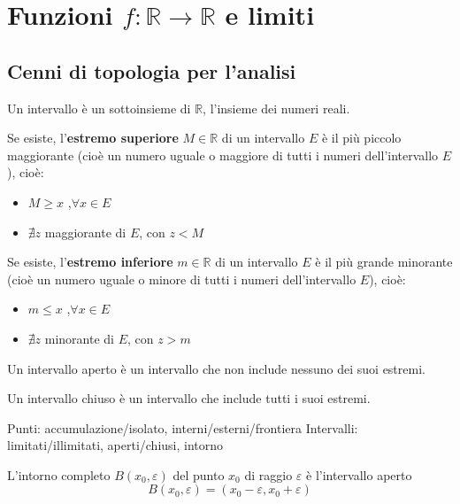 

\chapter{Funzioni $f:\mathbb{R} \rightarrow \mathbb{R}$ e limiti}

\section{Cenni di topologia per l'analisi}
\begin{definition}[Intervallo] Un intervallo è un sottoinsieme di $\mathbb{R}$, l'insieme dei numeri reali.
\end{definition}
\begin{definition} Se esiste, l'\textbf{estremo superiore} $M \in \mathbb{R}$ di un intervallo $E$ è il più piccolo maggiorante (cioè un numero uguale o maggiore di tutti i numeri dell'intervallo $E$), cioè:
    \begin{itemize}
        \item $M \ge x$ ,$\forall x \in E$
        \item $\nexists z$ maggiorante di $E$, con $z < M$
    \end{itemize}
    Se esiste, l'\textbf{estremo inferiore} $m \in \mathbb{R}$ di un intervallo $E$ è il più grande minorante (cioè un numero uguale o minore di tutti i numeri dell'intervallo $E$), cioè:
    \begin{itemize}
        \item $m \le x$ ,$\forall x \in E$
        \item $\nexists z$ minorante di $E$, con $z > m$
    \end{itemize}
\end{definition}
\begin{definition} Un intervallo aperto è un intervallo che non include nessuno dei suoi estremi.
\end{definition}
\begin{definition} Un intervallo chiuso è un intervallo che include tutti i suoi estremi.
\end{definition}
Punti: accumulazione/isolato, interni/esterni/frontiera
Intervalli: limitati/illimitati, aperti/chiusi, intorno
\begin{definition} L'intorno completo $B(x_0, \varepsilon)$ del punto $x_0$ di raggio $\varepsilon$ è l'intervallo aperto
    \begin{equation}
        B(x_0, \varepsilon) = (x_0 - \varepsilon, x_0 + \varepsilon)  
    \end{equation}
\end{definition}
